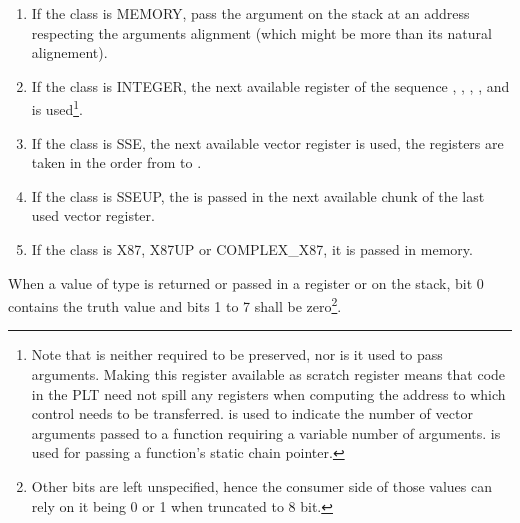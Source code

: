 \begin{enumerate}
\item If the class is MEMORY, pass the argument on the stack at an
  address respecting the arguments alignment (which might be more
  than its natural alignement).

\item If the class is INTEGER, the next available register of the
  sequence \RDI, \RSI, \RDX, \RCX,  and  is
  used\footnote{Note that  is neither required to be
    preserved, nor is it used to pass arguments.  Making this register
    available as scratch register means that code in the PLT need not
    spill any registers when computing the address to which control
    needs to be transferred.   is used to indicate the number of
    vector arguments passed to a function requiring a variable number of
    arguments.  is used for passing a function's static chain
    pointer.}.

\item If the class is SSE, the next available vector register is used, the
   registers are taken in the order from  to .

\item If the class is SSEUP, the \eightbyte is passed in the next
   available \eightbyte chunk of the last used vector register.

\item If the class is X87, X87UP or COMPLEX\_X87, it is passed in memory.
\end{enumerate}

When a value of type  is returned or passed in a register or
on the stack, bit 0 contains the truth value and bits 1 to 7 shall be
zero\footnote{Other bits are left unspecified, hence the consumer
side of those values can rely on it being 0 or 1 when truncated to 8
bit.}.

